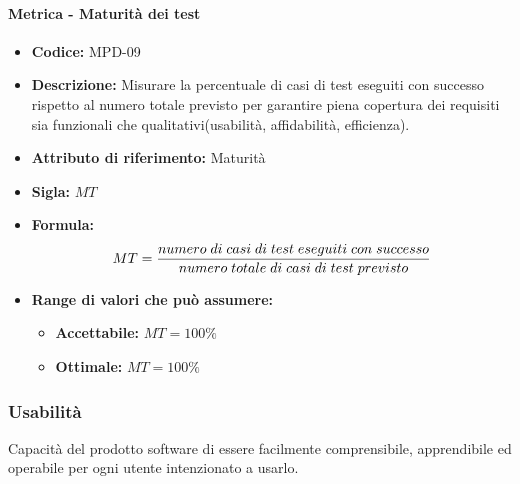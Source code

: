     \paragraph{Metrica - Maturità dei test} 
        \begin{itemize}
        \item   \textbf{Codice:} MPD-09
        \item  \textbf{Descrizione:} Misurare la percentuale di casi di test eseguiti con successo rispetto al numero totale previsto per garantire piena copertura dei requisiti sia funzionali che qualitativi(usabilità, affidabilità, efficienza).
        \item   \textbf{Attributo di riferimento:} Maturità
        \item    \textbf{Sigla:} $MT$
        \item   \textbf{Formula:} $$MT = {numero \; di \; casi \; di \; test \; eseguiti \; con \; successo \over numero \; totale \; di \; casi \; di \; test \; previsto }$$
    
        
        \item \textbf{Range di valori che può assumere:}
        \begin{itemize}
            \item \textbf{Accettabile:} $MT = 100\% $
            \item \textbf{Ottimale:} $MT = 100\% $
        \end{itemize}
    \end{itemize}
       
\subsubsection{Usabilità}
   Capacità del prodotto software di essere facilmente comprensibile, apprendibile ed operabile per ogni utente intenzionato a usarlo.
   
